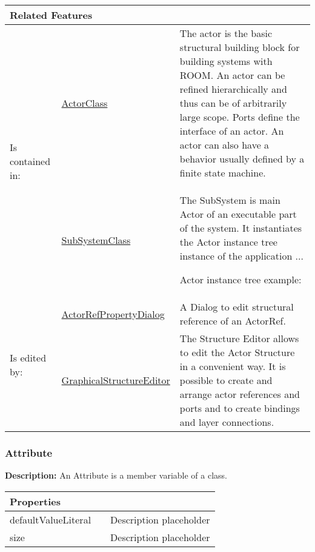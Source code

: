 			\begingroup
			\renewcommand{\arraystretch}{1.8} %
			\begin{longtable}{p{2.5cm}|p{4cm} p{}}
				\multicolumn{2}{l}{\textbf{\large Related Features}} & \\
				\hline
			\multirow{2}{*}{Is contained in:} & \tabitem \hyperlink{ref:ActorClass}{ActorClass}  & The actor is the basic structural building block for building systems with ROOM. An actor can be refined hierarchically and thus can be of arbitrarily large scope. Ports define the interface of an actor. An actor can also have a behavior usually defined by a finite state machine. \\
			& \tabitem \hyperlink{ref:SubSystemClass}{SubSystemClass}  & The SubSystem is main Actor of an executable part of the system. It instantiates the Actor instance tree instance of the application ...
				
				Actor instance tree example:
			 \\
			\hline
			\multirow{2}{*}{Is edited by:} & \tabitem \hyperlink{ref:ActorRefPropertyDialog}{ActorRefPropertyDialog}  & A Dialog to edit structural reference of an ActorRef.
			\\
			& \tabitem \hyperlink{ref:GraphicalStructureEditor}{GraphicalStructureEditor}  & The Structure Editor allows to edit the Actor Structure in a convenient way. It is possible to create and arrange actor references and ports and to create bindings and layer connections. \\
			\hline
			\end{longtable}
			\endgroup
			
			
			
		\vspace{\baselineskip}
		\vspace{\baselineskip}
		\vspace{\baselineskip}
		
		\subsubsection{\huge Attribute}
			\hypertarget{ref:Attribute}{}
			
			\textbf{Description:} An Attribute is a member variable of a class. 
			
			\begingroup
			\renewcommand{\arraystretch}{1.8} %
			\begin{longtable}{p{2.5cm}p{4cm} p{}}
				\multicolumn{2}{l}{\textbf{\large Properties}} \\
				\hline
			\tabitem defaultValueLiteral &  & Description placeholder\\
			\tabitem size &  & Description placeholder\\
			\end{longtable}
			\endgroup
			
